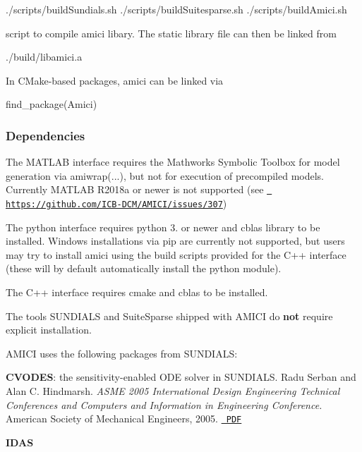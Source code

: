 \begin{DoxyVerb}./scripts/buildSundials.sh
./scripts/buildSuitesparse.sh
./scripts/buildAmici.sh
\end{DoxyVerb}


script to compile amici libary. The static library file can then be linked from \begin{DoxyVerb}./build/libamici.a
\end{DoxyVerb}


In C\+Make-\/based packages, amici can be linked via \begin{DoxyVerb}find_package(Amici)
\end{DoxyVerb}


\subsubsection*{Dependencies}

The M\+A\+T\+L\+AB interface requires the Mathworks Symbolic Toolbox for model generation via {\ttfamily amiwrap(...)}, but not for execution of precompiled models. Currently M\+A\+T\+L\+AB R2018a or newer is not supported (see \href{https://github.com/ICB-DCM/AMICI/issues/307}{\texttt{ https\+://github.\+com/\+I\+C\+B-\/\+D\+C\+M/\+A\+M\+I\+C\+I/issues/307}})

The python interface requires python 3. or newer and {\ttfamily cblas} library to be installed. Windows installations via pip are currently not supported, but users may try to install amici using the build scripts provided for the C++ interface (these will by default automatically install the python module).

The C++ interface requires {\ttfamily cmake} and {\ttfamily cblas} to be installed.

The tools S\+U\+N\+D\+I\+A\+LS and Suite\+Sparse shipped with A\+M\+I\+CI do {\bfseries{not}} require explicit installation.

A\+M\+I\+CI uses the following packages from S\+U\+N\+D\+I\+A\+LS\+:

{\bfseries{C\+V\+O\+D\+ES}}\+: the sensitivity-\/enabled O\+DE solver in S\+U\+N\+D\+I\+A\+LS. Radu Serban and Alan C. Hindmarsh. {\itshape A\+S\+ME 2005 International Design Engineering Technical Conferences and Computers and Information in Engineering Conference.} American Society of Mechanical Engineers, 2005. \href{http://proceedings.asmedigitalcollection.asme.org/proceeding.aspx?articleid=1588657}{\texttt{ P\+DF}}

{\bfseries{I\+D\+AS}}

